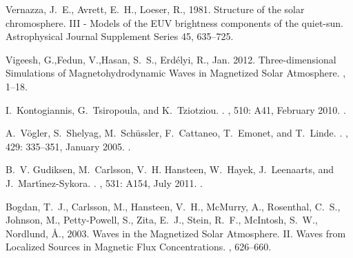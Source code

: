 \documentclass{aastex62}
\begin{document}
\begin{thebibliography}{}
{Vernazza}, J.~E., {Avrett}, E.~H., {Loeser}, R., 1981. {Structure of the solar
  chromosphere. III - Models of the EUV brightness components of the
  quiet-sun}. Astrophysical Journal Supplement Series 45, 635--725.

{Vigeesh}, G.,{Fedun}, V.,{Hasan}, S.~S., {Erd{\'e}lyi}, R.,  Jan. 2012. {Three-dimensional Simulations of Magnetohydrodynamic Waves in Magnetized Solar Atmosphere}. , 1--18.

I.~{Kontogiannis}, G.~{Tsiropoula}, and K.~{Tziotziou}.
.
\newblock \emph{\aap}, 510: A41, February 2010.
\newblock {}.

A.~{V{\"o}gler}, S.~{Shelyag}, M.~{Sch{\"u}ssler}, F.~{Cattaneo}, T.~{Emonet},
  and T.~{Linde}.
.
\newblock \emph{\aap}, 429: 335--351, January 2005.
\newblock {}.

B.~V. {Gudiksen}, M.~{Carlsson}, V.~H. {Hansteen}, W.~{Hayek}, J.~{Leenaarts},
  and J.~{Mart{\'{\i}}nez-Sykora}.
.
\newblock \emph{\aap}, 531: A154, July 2011.
\newblock {}.

{Bogdan}, T.~J., {Carlsson}, M., {Hansteen}, V.~H., {McMurry}, A., {Rosenthal},
  C.~S., {Johnson}, M., {Petty-Powell}, S., {Zita}, E.~J., {Stein}, R.~F.,
  {McIntosh}, S.~W., {Nordlund}, {\AA}., 2003. {Waves in the Magnetized Solar
  Atmosphere. II. Waves from Localized Sources in Magnetic Flux
  Concentrations}. , 626--660.




\end{thebibliography}
\end{document}
